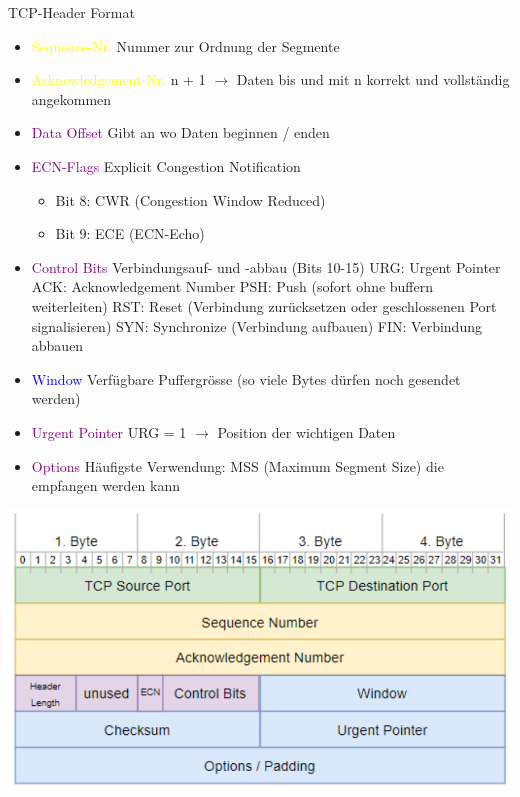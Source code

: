 \begin{concept}{TCP-Header Format}
    \begin{itemize}
        \item \textcolor{yellow}{Sequence-Nr.} Nummer zur Ordnung der Segmente
        \item \textcolor{yellow}{Acknowledgement-Nr.} n + 1 $\rightarrow$ Daten bis und mit n korrekt und vollständig angekommen
        \item \textcolor{purple}{Data Offset} Gibt an wo Daten beginnen / enden
        \item \textcolor{purple}{ECN-Flags} Explicit Congestion Notification
        \begin{itemize}
            \item Bit 8: CWR (Congestion Window Reduced)
            \item Bit 9: ECE (ECN-Echo)
        \end{itemize}
        \item \textcolor{purple}{Control Bits} Verbindungsauf- und -abbau (Bits 10-15)
        URG: Urgent Pointer
        ACK: Acknowledgement Number
        PSH: Push (sofort ohne buffern weiterleiten)
        RST: Reset (Verbindung zurücksetzen oder geschlossenen Port signalisieren)
        SYN: Synchronize (Verbindung aufbauen)
        FIN: Verbindung abbauen
        \item \textcolor{blue}{Window} Verfügbare Puffergrösse (so viele Bytes dürfen noch gesendet werden)
        \item \textcolor{purple}{Urgent Pointer} URG = 1 $\rightarrow$ Position der wichtigen Daten
        \item \textcolor{purple}{Options} Häufigste Verwendung: MSS (Maximum Segment Size) die empfangen werden kann
    \end{itemize}
    \includegraphics[width=1\linewidth]{images/tcpheader.png}
\end{concept}


